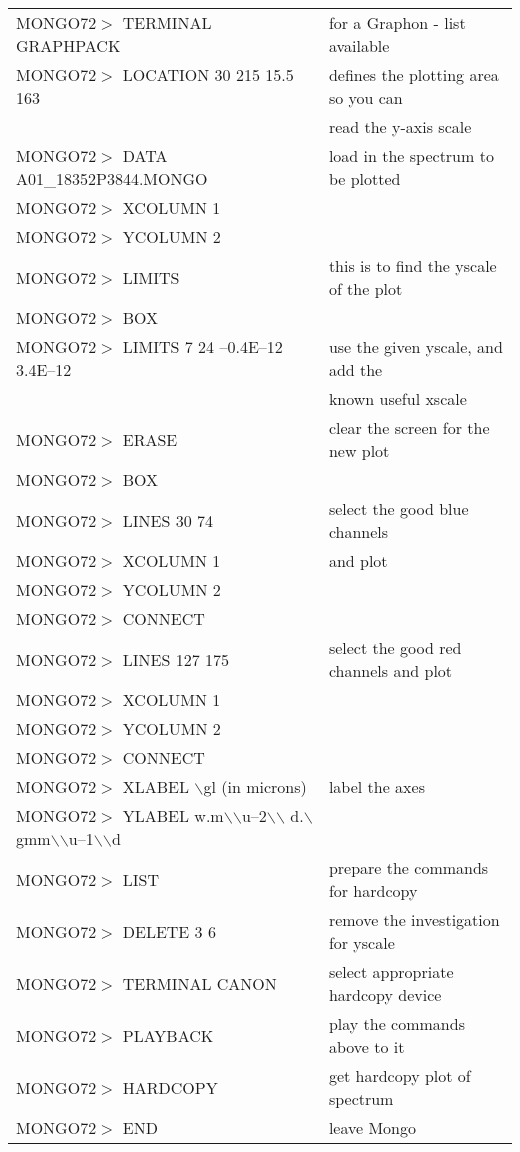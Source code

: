 \begin{tabular}{ll}
MONGO72$>$ TERMINAL GRAPHPACK      & for a Graphon - list available\\
MONGO72$>$ LOCATION 30 215 15.5 163& defines the plotting area so you can \\
                                   & read the y-axis scale\\
MONGO72$>$ DATA A01\_18352P3844.MONGO& load in the spectrum to be plotted\\
MONGO72$>$ XCOLUMN 1               &  \\
MONGO72$>$ YCOLUMN 2               &  \\
MONGO72$>$ LIMITS                  & this is to find the yscale of the plot \\
MONGO72$>$ BOX                     & \\
MONGO72$>$ LIMITS 7 24 --0.4E--12 3.4E--12& use the given yscale, and add the\\
                                   & known useful xscale\\
MONGO72$>$ ERASE                   & clear the screen for the new plot\\
MONGO72$>$ BOX                     &  \\
MONGO72$>$ LINES 30 74             & select the good blue channels \\
MONGO72$>$ XCOLUMN 1               & and plot \\
MONGO72$>$ YCOLUMN 2               &  \\
MONGO72$>$ CONNECT                 &  \\
MONGO72$>$ LINES 127 175           & select the good red channels and plot\\
MONGO72$>$ XCOLUMN 1               &  \\
MONGO72$>$ YCOLUMN 2               &  \\
MONGO72$>$ CONNECT                 &  \\
MONGO72$>$ XLABEL $\backslash$gl (in microns)& label the axes\\
MONGO72$>$ YLABEL w.m$\backslash$$\backslash$u--2$\backslash$$\backslash$
  d.$\backslash$gmm$\backslash$$\backslash$u--1$\backslash$$\backslash$d& \\
MONGO72$>$ LIST                    & prepare the commands for hardcopy\\ 
MONGO72$>$ DELETE 3 6              & remove the investigation for yscale\\
MONGO72$>$ TERMINAL CANON          & select appropriate hardcopy device\\
MONGO72$>$ PLAYBACK                & play the commands above to it\\
MONGO72$>$ HARDCOPY                & get hardcopy plot of spectrum\\
MONGO72$>$ END                     & leave Mongo\\
\end{tabular}

